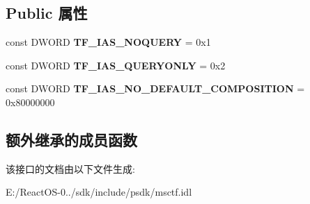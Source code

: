 \subsection*{Public 属性}
\begin{DoxyCompactItemize}
\item 
\mbox{\label{interface_i_tf_insert_at_selection_a2b562b89f2b694ea5eceb904a48deab4}} 
const D\+W\+O\+RD {\bfseries T\+F\+\_\+\+I\+A\+S\+\_\+\+N\+O\+Q\+U\+E\+RY} = 0x1
\item 
\mbox{\label{interface_i_tf_insert_at_selection_a99e2b6e6fd665c858aac1f708a3bf615}} 
const D\+W\+O\+RD {\bfseries T\+F\+\_\+\+I\+A\+S\+\_\+\+Q\+U\+E\+R\+Y\+O\+N\+LY} = 0x2
\item 
\mbox{\label{interface_i_tf_insert_at_selection_a7102c281f9ccef6d2afa518a5d7a64c0}} 
const D\+W\+O\+RD {\bfseries T\+F\+\_\+\+I\+A\+S\+\_\+\+N\+O\+\_\+\+D\+E\+F\+A\+U\+L\+T\+\_\+\+C\+O\+M\+P\+O\+S\+I\+T\+I\+ON} = 0x80000000
\end{DoxyCompactItemize}
\subsection*{额外继承的成员函数}


该接口的文档由以下文件生成\+:\begin{DoxyCompactItemize}
\item 
E\+:/\+React\+O\+S-\/0../sdk/include/psdk/msctf.\+idl\end{DoxyCompactItemize}

